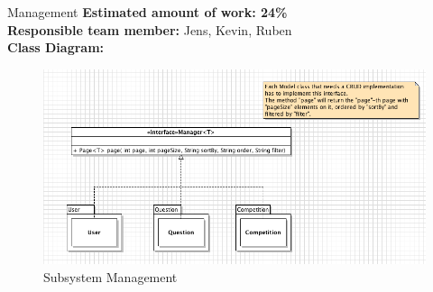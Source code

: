 \begin{subsection}{Management}
	\textbf{Estimated amount of work: 24\%} \\
	\textbf{Responsible team member:} Jens, Kevin, Ruben \\
	\textbf{Class Diagram:} \\
	
	\begin{figure}[!h]
	    \centering
			\includegraphics[width=1\textwidth]{../class_diagrams/management.png}
	    \caption{Subsystem Management}
	    \label{subsystem_management}
	\end{figure}

\end{subsection}